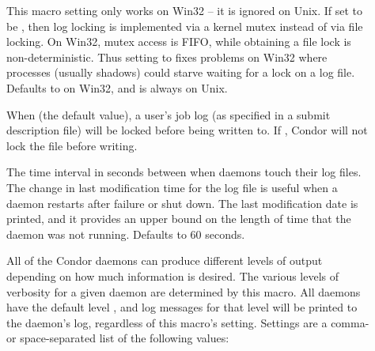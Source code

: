 \begin{description}
\item[] \label{param:FileLockViaMutex} 
  This macro setting only works on Win32 -- it is ignored on Unix.  If set
  to be , then log locking is implemented via a kernel mutex
  instead of via file locking.  On Win32, mutex access is FIFO, while
  obtaining a file lock is non-deterministic.  Thus setting to 
  fixes problems on Win32 where processes (usually shadows) could starve
  waiting for a lock on a log file.  Defaults to  on Win32, and is
  always  on Unix.

\item[] \label{param:EnableUserlogLocking}
  When  (the default value),
  a user's job log (as specified in a submit description file)
  will be locked before being written to.
  If , Condor will not lock the file before writing.

\item[] \label{param:TouchLogInterval}
  The time interval in seconds between when daemons touch
  their log files.  The change in last modification time for the
  log file is useful when a daemon restarts after failure or shut down.
  The last modification date is printed, and it provides an upper bound
  on the length of time that the daemon was not running.
  Defaults to 60 seconds.

\item[] \label{param:SubsysDebug}
  All of the
  Condor daemons can produce different levels of output depending on
  how much information is desired.  The various levels of
  verbosity for a given daemon are determined by this macro.  All
  daemons have the default level , and log messages for
  that level will be printed to the daemon's log, regardless of this
  macro's setting.  Settings are a comma- or space-separated list
  of the following values:

\end{description}
